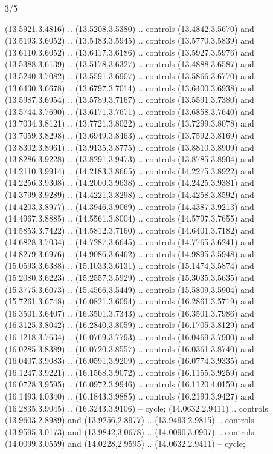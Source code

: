 \begin{flagdescription}{3/5}
{\begin{scope}[fill=gold]
  (13.5921,3.4816) .. (13.5208,3.5380) .. controls (13.4842,3.5670) and
  (13.5193,3.6052) .. (13.5483,3.5945) .. controls (13.5770,3.5839) and
  (13.6110,3.6052) .. (13.6417,3.6186) .. controls (13.5927,3.5976) and
  (13.5388,3.6139) .. (13.5178,3.6327) .. controls (13.4888,3.6587) and
  (13.5240,3.7082) .. (13.5591,3.6907) .. controls (13.5866,3.6770) and
  (13.6430,3.6678) .. (13.6797,3.7014) .. controls (13.6400,3.6938) and
  (13.5987,3.6954) .. (13.5789,3.7167) .. controls (13.5591,3.7380) and
  (13.5744,3.7690) .. (13.6171,3.7671) .. controls (13.6858,3.7640) and
  (13.7034,3.8121) .. (13.7721,3.8022) .. controls (13.7299,3.8078) and
  (13.7059,3.8298) .. (13.6949,3.8463) .. controls (13.7592,3.8169) and
  (13.8302,3.8961) .. (13.9135,3.8775) .. controls (13.8810,3.8909) and
  (13.8286,3.9228) .. (13.8291,3.9473) .. controls (13.8785,3.8904) and
  (14.2110,3.9914) .. (14.2183,3.8665) .. controls (14.2275,3.8922) and
  (14.2256,3.9308) .. (14.2000,3.9638) .. controls (14.2425,3.9381) and
  (14.3799,3.9289) .. (14.4221,3.8298) .. controls (14.4258,3.8592) and
  (14.4203,3.8977) .. (14.3946,3.9069) .. controls (14.4387,3.9213) and
  (14.4967,3.8885) .. (14.5561,3.8004) .. controls (14.5797,3.7655) and
  (14.5853,3.7422) .. (14.5812,3.7160) .. controls (14.6401,3.7182) and
  (14.6828,3.7034) .. (14.7287,3.6645) .. controls (14.7765,3.6241) and
  (14.8279,3.6976) .. (14.9086,3.6462) .. controls (14.9895,3.5948) and
  (15.0593,3.6388) .. (15.1033,3.6131) .. controls (15.1474,3.5874) and
  (15.2080,3.6223) .. (15.2557,3.5929) .. controls (15.3035,3.5635) and
  (15.3775,3.6073) .. (15.4566,3.5449) .. controls (15.5809,3.5904) and
  (15.7261,3.6748) .. (16.0821,3.6094) .. controls (16.2861,3.5719) and
  (16.3501,3.6407) .. (16.3501,3.7343) .. controls (16.3501,3.7986) and
  (16.3125,3.8042) .. (16.2840,3.8059) .. controls (16.1705,3.8129) and
  (16.1218,3.7634) .. (16.0769,3.7793) .. controls (16.0469,3.7900) and
  (16.0285,3.8389) .. (16.0720,3.8557) .. controls (16.0361,3.8740) and
  (16.0407,3.9083) .. (16.0591,3.9209) .. controls (16.0774,3.9335) and
  (16.1247,3.9221) .. (16.1568,3.9072) .. controls (16.1155,3.9259) and
  (16.0728,3.9595) .. (16.0972,3.9946) .. controls (16.1120,4.0159) and
  (16.1493,4.0340) .. (16.1843,3.9885) .. controls (16.2193,3.9427) and
  (16.2835,3.9045) .. (16.3243,3.9106) -- cycle;
 (14.0632,2.9411) .. controls (13.9603,2.8989) and
  (13.9256,2.8977) .. (13.9493,2.9815) .. controls (13.9595,3.0173) and
  (13.9842,3.0678) .. (14.0090,3.0907) .. controls (14.0099,3.0559) and
  (14.0228,2.9595) .. (14.0632,2.9411) -- cycle;

\end{scope}}
\end{flagdescription}
